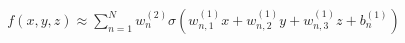 \documentclass[preview]{standalone}
\begin{document}
\begin{align*}
f(x,y,z) \approx  \sum_{n=1}^{N} w_n^{(2)} \sigma(w_{n,1}^{(1)}x + w_{n,2}^{(1)}y + w_{n,3}^{(1)}z +b_n^{(1)})
\end{align*}
\end{document}
